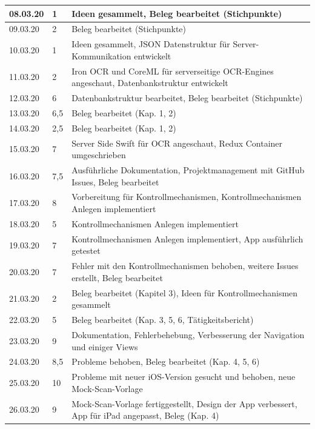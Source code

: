 \documentclass[notables, nomenclature, oneside, 150]{HSMW-Thesis}
\begin{document}
\begin{longtable}{
		|p{}
		|p{}
		|p{}|
	}
        08.03.20 & 1 & Ideen gesammelt, Beleg bearbeitet (Stichpunkte) \\ \hline
        \hline
        09.03.20 & 2 & Beleg bearbeitet (Stichpunkte) \\ \hline
        10.03.20 & 1 & Ideen gesammelt, JSON Datenstruktur für Server-Kommunikation entwickelt \\ \hline
        11.03.20 & 2 & Iron OCR und CoreML  für serverseitige OCR-Engines angeschaut, Datenbankstruktur entwickelt \\ \hline
        12.03.20 & 6 & Datenbankstruktur bearbeitet, Beleg bearbeitet (Stichpunkte) \\ \hline
        13.03.20 & 6,5 & Beleg bearbeitet (Kap. 1, 2) \\ \hline
        14.03.20 & 2,5 & Beleg bearbeitet (Kap. 1, 2) \\ \hline
        15.03.20 & 7 & Server Side Swift für OCR angeschaut, Redux Container umgeschrieben \\ \hline
        \hline
        16.03.20 & 7,5 & Ausführliche Dokumentation, Projektmanagement mit GitHub Issues, Beleg bearbeitet \\ \hline
        17.03.20 & 8 & Vorbereitung für Kontrollmechanismen, Kontrollmechanismen Anlegen implementiert \\ \hline
        18.03.20 & 5 & Kontrollmechanismen Anlegen implementiert \\ \hline
        19.03.20 & 7 & Kontrollmechanismen Anlegen implementiert, App ausführlich getestet \\ \hline
        20.03.20 & 7 & Fehler mit den Kontrollmechanismen behoben, weitere Issues erstellt, Beleg bearbeitet \\ \hline
        21.03.20 & 2 & Beleg bearbeitet (Kapitel 3), Ideen für Kontrollmechanismen gesammelt \\ \hline
        22.03.20 & 5 & Beleg bearbeitet (Kap. 3, 5, 6, Tätigkeitsbericht) \\ \hline
        \hline
        23.03.20 & 9 & Dokumentation, Fehlerbehebung, Verbesserung der Navigation und einiger Views \\ \hline
        24.03.20 & 8,5 & Probleme behoben, Beleg bearbeitet (Kap. 4, 5, 6) \\ \hline
        25.03.20 & 10 & Probleme mit neuer iOS-Version gesucht und behoben, neue Mock-Scan-Vorlage  \\ \hline
        26.03.20 & 9 & Mock-Scan-Vorlage fertiggestellt, Design der App verbessert, App für iPad angepasst, Beleg (Kap. 4) \\ \hline

\end{longtable}
\end{document}
